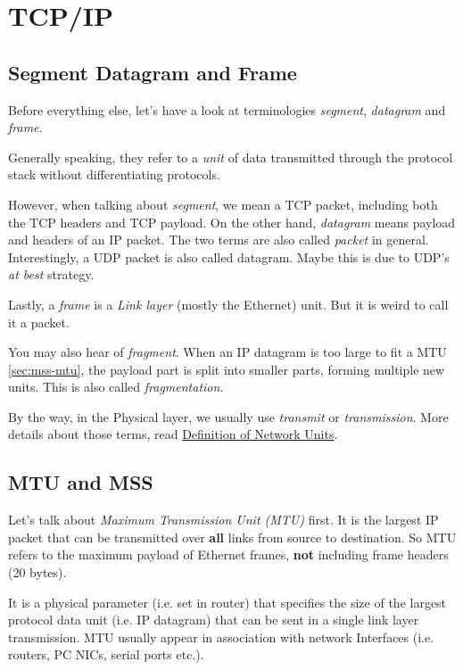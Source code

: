\chapter{TCP/IP}
\label{cha:tcpip}

\section{Segment Datagram and Frame}
\label{sec:segment-datagram-frame}

Before everything else, let's have a look at terminologies
\textit{segment}, \textit{datagram} and \textit{frame}.

Generally speaking, they refer to a \textit{unit} of data
transmitted through the protocol stack without differentiating
protocols.

However, when talking about \textit{segment}, we mean a TCP
packet, including both the TCP headers and TCP payload. On the
other hand, \textit{datagram} means payload and headers of an IP
packet. The two terms are also called \textit{packet} in
general. Interestingly, a UDP packet is also called
datagram. Maybe this is due to UDP's \textit{at best} strategy.

Lastly, a \textit{frame} is a \textit{Link layer} (mostly the
Ethernet) unit. But it is weird to call it a packet.

You may also hear of \textit{fragment}. When an IP datagram is too
large to fit a MTU \ref{sec:mss-mtu}, the payload part is split
into smaller parts, forming multiple new units. This is also
called \textit{fragmentation}.

By the way, in the Physical layer, we usually use
\textit{transmit} or \textit{transmission}. More details about
those terms, read
\href{https://stackoverflow.com/a/11637061}{Definition of Network
  Units}.

\section{MTU and MSS}
\label{sec:mtu-mss}

Let's talk about \textit{Maximum Transmission Unit (MTU)}
first. It is the largest IP packet that can be transmitted over
\textbf{all} links from source to destination. So MTU refers to
the maximum payload of Ethernet frames, \textbf{not} including
frame headers (20 bytes).

It is a physical parameter (i.e. set in router) that specifies the
size of the largest protocol data unit (i.e. IP datagram) that can
be sent in a single link layer transmission. MTU usually appear in
association with network Interfaces (i.e. routers, PC NICs, serial
ports etc.).

